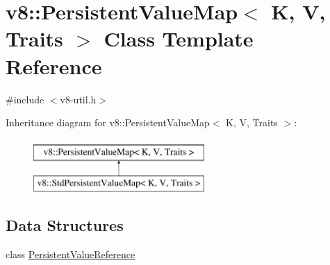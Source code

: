 \hypertarget{classv8_1_1PersistentValueMap}{}\section{v8\+:\+:Persistent\+Value\+Map$<$ K, V, Traits $>$ Class Template Reference}
\label{classv8_1_1PersistentValueMap}


{\ttfamily \#include $<$v8-\/util.\+h$>$}

Inheritance diagram for v8\+:\+:Persistent\+Value\+Map$<$ K, V, Traits $>$\+:\begin{figure}[H]
\begin{center}
\leavevmode
\includegraphics[height=2.000000cm]{classv8_1_1PersistentValueMap}
\end{center}
\end{figure}
\subsection*{Data Structures}
\begin{DoxyCompactItemize}
\item 
class \hyperlink{classv8_1_1PersistentValueMap_1_1PersistentValueReference}{Persistent\+Value\+Reference}
\end{DoxyCompactItemize}
